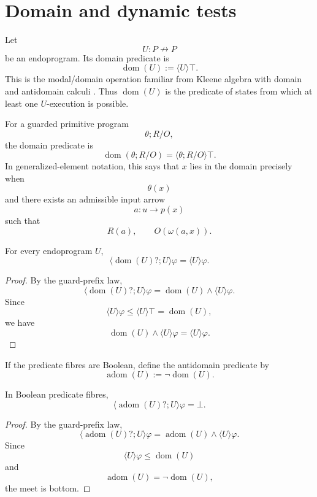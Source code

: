 \section{Domain and dynamic tests}
\label{sec:domain-and-dynamic-tests}

Let
\[
U:P\nrightarrow P
\]
be an endoprogram. Its domain predicate is
\[
\operatorname{dom}(U):=\langle U\rangle\top.
\]
This is the modal/domain operation familiar from Kleene algebra with
domain and antidomain calculi
\cite{DesharnaisMoellerStruthKleeneAlgebraDomain}.
Thus \(\operatorname{dom}(U)\) is the predicate of states from which at
least one \(U\)-execution is possible.

For a guarded primitive program
\[
\theta;R/O,
\]
the domain predicate is
\[
\operatorname{dom}(\theta;R/O)
=
\langle \theta;R/O\rangle\top.
\]
In generalized-element notation, this says that \(x\) lies in the domain
precisely when
\[
\theta(x)
\]
and there exists an admissible input arrow
\[
a:u\to p(x)
\]
such that
\[
R(a),
\qquad
O(\omega(a,x)).
\]

\begin{proposition}
\label{prop:domain-prefix-law}
For every endoprogram \(U\),
\[
\langle \operatorname{dom}(U)?;U\rangle\varphi
=
\langle U\rangle\varphi.
\]
\end{proposition}

\begin{proof}
By the guard-prefix law,
\[
\langle \operatorname{dom}(U)?;U\rangle\varphi
=
\operatorname{dom}(U)\wedge\langle U\rangle\varphi.
\]
Since
\[
\langle U\rangle\varphi\le \langle U\rangle\top
=
\operatorname{dom}(U),
\]
we have
\[
\operatorname{dom}(U)\wedge\langle U\rangle\varphi
=
\langle U\rangle\varphi.
\]
\end{proof}

If the predicate fibres are Boolean, define the antidomain predicate by
\[
\operatorname{adom}(U):=\neg\operatorname{dom}(U).
\]

\begin{proposition}
\label{prop:antidomain-annihilation}
In Boolean predicate fibres,
\[
\langle \operatorname{adom}(U)?;U\rangle\varphi
=
\bot.
\]
\end{proposition}

\begin{proof}
By the guard-prefix law,
\[
\langle \operatorname{adom}(U)?;U\rangle\varphi
=
\operatorname{adom}(U)\wedge\langle U\rangle\varphi.
\]
Since
\[
\langle U\rangle\varphi\le \operatorname{dom}(U)
\]
and
\[
\operatorname{adom}(U)=\neg\operatorname{dom}(U),
\]
the meet is bottom.
\end{proof}

